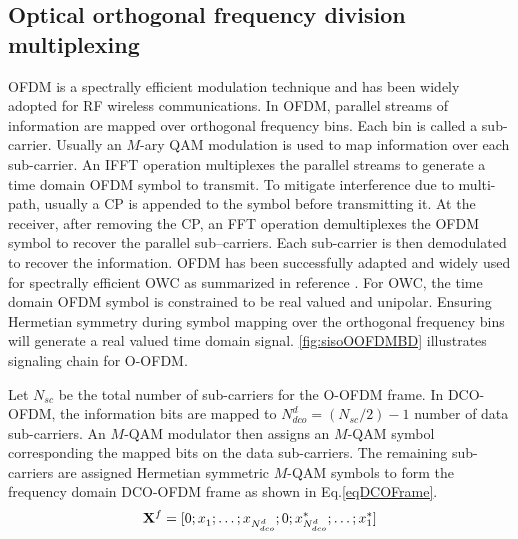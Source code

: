 \subsection{Optical orthogonal frequency division multiplexing}
\label{subsec:sisoModulationOOFDM}
OFDM is a spectrally efficient modulation technique and has been widely adopted for RF wireless communications. In OFDM, parallel streams of information are mapped over orthogonal frequency bins. Each bin is called a sub-carrier. Usually an $M$-ary QAM modulation is used to map information over each sub-carrier. An IFFT operation multiplexes the parallel streams to generate a time domain OFDM symbol to transmit. To mitigate interference due to multi-path, usually a CP is appended to the symbol before transmitting it. At the receiver, after removing the CP, an FFT operation demultiplexes the OFDM symbol to recover the parallel sub--carriers. Each sub-carrier is then demodulated to recover the information. OFDM has been successfully adapted and widely used for spectrally efficient OWC as summarized in reference \cite{arm09a}. For OWC, the time domain OFDM symbol is constrained to be real valued and unipolar. Ensuring Hermetian symmetry during symbol mapping over the orthogonal frequency bins will generate a real valued time domain signal. \figurename{ \ref{fig:sisoOOFDMBD}} illustrates signaling chain for O-OFDM. 


Let $N_{sc}$ be the total number of sub-carriers for the O-OFDM frame. In DCO-OFDM,  the information bits are mapped to $N_{dco}^{d} = (N_{sc}/2) - 1$ number of data sub-carriers. An $M$-QAM modulator then assigns an $M$-QAM symbol corresponding the mapped bits on the data sub-carriers. The remaining sub-carriers are assigned Hermetian symmetric $M$-QAM symbols to form the frequency domain DCO-OFDM frame as shown in Eq.\eqref{eqDCOFrame}. 
\begin{equation}
	{\bf{X}}^{f} = [0; x_{1}^{ }; \ldots; x_{N_{dco}^{d}}^{ }; 0; x_{N_{dco}^{d}}^{*}; \ldots; x_{1}^{*}]
\label{eqDCOFrame}
\end{equation}


